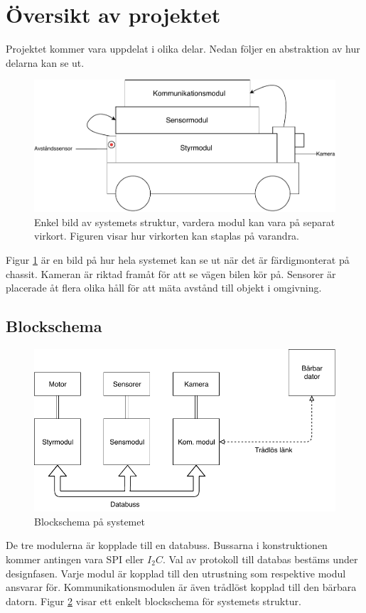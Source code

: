 \documentclass[systemskiss/skiss.tex]{subfiles}
\begin{document}
\section{Översikt av projektet}
Projektet kommer vara uppdelat i olika delar. Nedan följer en abstraktion av
hur delarna kan se ut.

\begin{figure}[h]
    \centering
    \includegraphics[width=0.6\linewidth]{systemskiss/figures/taxibilen.pdf}
    \caption{Enkel bild av systemets struktur, vardera modul kan vara på
separat virkort. Figuren visar hur virkorten kan staplas på varandra.}
    \label{fig:taxiskiss}
\end{figure}
Figur \ref{fig:taxiskiss} är en bild på hur hela systemet kan se ut när det är
färdigmonterat på chassit. Kameran är riktad framåt för att se vägen bilen kör
på. Sensorer är placerade åt flera olika håll för att mäta avstånd till objekt
i omgivning.

\subsection{Blockschema}

\begin{figure}[h]
    \centering
    \includegraphics[width=0.6\linewidth]{systemskiss/figures/blockskiss.pdf}
    \caption{Blockschema på systemet}
    \label{fig:blockskiss}
\end{figure}

De tre modulerna är kopplade till en databuss. Bussarna i konstruktionen kommer
antingen vara SPI eller $I_{2}C$. Val av protokoll till databas bestäms under designfasen.
Varje modul är kopplad till den utrustning som respektive modul ansvarar för. Kommunikationsmodulen är även trådlöst kopplad till den bärbara datorn. Figur \ref{fig:blockskiss} visar ett enkelt blockschema för systemets struktur.
 
\end{document}
